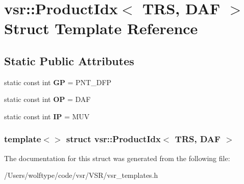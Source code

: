 \hypertarget{structvsr_1_1_product_idx_3_01_t_r_s_00_01_d_a_f_01_4}{\section{vsr\-:\-:Product\-Idx$<$ T\-R\-S, D\-A\-F $>$ Struct Template Reference}
\label{structvsr_1_1_product_idx_3_01_t_r_s_00_01_d_a_f_01_4}
}
\subsection*{Static Public Attributes}
\begin{DoxyCompactItemize}
\item 
\hypertarget{structvsr_1_1_product_idx_3_01_t_r_s_00_01_d_a_f_01_4_a0fb8fa118220588a456e2fa308e8b245}{static const int {\bfseries G\-P} = P\-N\-T\-\_\-\-D\-F\-P}\label{structvsr_1_1_product_idx_3_01_t_r_s_00_01_d_a_f_01_4_a0fb8fa118220588a456e2fa308e8b245}

\item 
\hypertarget{structvsr_1_1_product_idx_3_01_t_r_s_00_01_d_a_f_01_4_a79387f2b1be38ee5ef8d459ef25ad0bb}{static const int {\bfseries O\-P} = D\-A\-F}\label{structvsr_1_1_product_idx_3_01_t_r_s_00_01_d_a_f_01_4_a79387f2b1be38ee5ef8d459ef25ad0bb}

\item 
\hypertarget{structvsr_1_1_product_idx_3_01_t_r_s_00_01_d_a_f_01_4_a66162876974d701786768f9dc00d1b74}{static const int {\bfseries I\-P} = M\-U\-V}\label{structvsr_1_1_product_idx_3_01_t_r_s_00_01_d_a_f_01_4_a66162876974d701786768f9dc00d1b74}

\end{DoxyCompactItemize}
\subsubsection*{template$<$$>$ struct vsr\-::\-Product\-Idx$<$ T\-R\-S, D\-A\-F $>$}



The documentation for this struct was generated from the following file\-:\begin{DoxyCompactItemize}
\item 
/\-Users/wolftype/code/vsr/\-V\-S\-R/vsr\-\_\-templates.\-h\end{DoxyCompactItemize}
